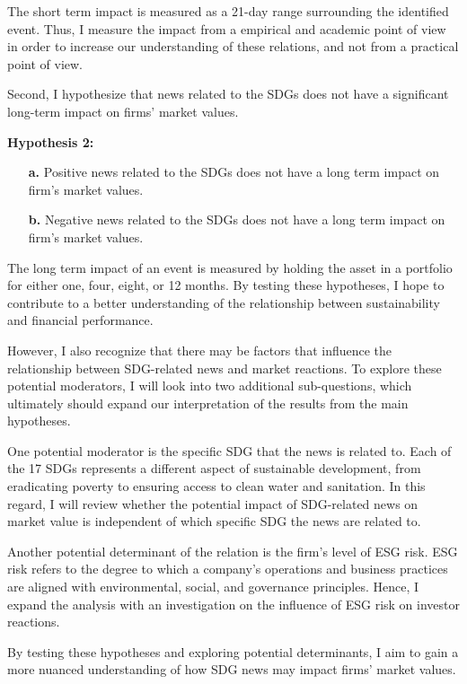 \noindent The short term impact is measured as a 21-day range surrounding the identified event. Thus, I measure the impact from a empirical and academic point of view in order to increase our understanding of these relations, and not from a practical point of view. 

Second, I hypothesize that news related to the SDGs does not have a significant long-term impact on firms' market values. 

\noindent \textbf{Hypothesis 2: }
\begin{itemize}
  \item[\textbf{a.}]  Positive news related to the SDGs does not have a long term impact on firm's market values.
  \item[\textbf{b.}]  Negative news related to the SDGs does not have a long term impact on firm's market values.
\end{itemize}

\noindent The long term impact of an event is measured by holding the asset in a portfolio for either one, four, eight, or 12 months. By testing these hypotheses, I hope to contribute to a better understanding of the relationship between sustainability and financial performance. 

\noindent However, I also recognize that there may be factors that influence the relationship between SDG-related news and market reactions. To explore these potential moderators, I will look into two additional sub-questions, which ultimately should expand our interpretation of the results from the main hypotheses. 

\noindent One potential moderator is the specific SDG that the news is related to. Each of the 17 SDGs represents a different aspect of sustainable development, from eradicating poverty to ensuring access to clean water and sanitation. In this regard, I will review whether the potential impact of SDG-related news on market value is independent of which specific SDG the news are related to.

\noindent Another potential determinant of the relation is the firm's level of ESG risk. ESG risk refers to the degree to which a company's operations and business practices are aligned with environmental, social, and governance principles. Hence, I expand the analysis with an investigation on the influence of ESG risk on investor reactions. 

By testing these hypotheses and exploring potential determinants, I aim to gain a more nuanced understanding of how SDG news may impact firms' market values. 

